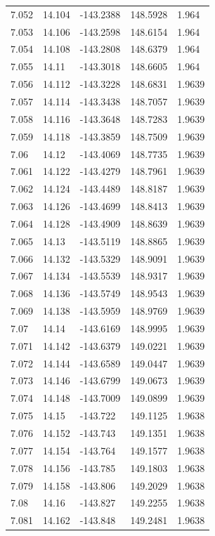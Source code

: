\begin{tabular}{lllll}
7.052 & 14.104 & -143.2388 & 148.5928 & 1.964 \\
7.053 & 14.106 & -143.2598 & 148.6154 & 1.964 \\
7.054 & 14.108 & -143.2808 & 148.6379 & 1.964 \\
7.055 & 14.11 & -143.3018 & 148.6605 & 1.964 \\
7.056 & 14.112 & -143.3228 & 148.6831 & 1.9639 \\
7.057 & 14.114 & -143.3438 & 148.7057 & 1.9639 \\
7.058 & 14.116 & -143.3648 & 148.7283 & 1.9639 \\
7.059 & 14.118 & -143.3859 & 148.7509 & 1.9639 \\
7.06 & 14.12 & -143.4069 & 148.7735 & 1.9639 \\
7.061 & 14.122 & -143.4279 & 148.7961 & 1.9639 \\
7.062 & 14.124 & -143.4489 & 148.8187 & 1.9639 \\
7.063 & 14.126 & -143.4699 & 148.8413 & 1.9639 \\
7.064 & 14.128 & -143.4909 & 148.8639 & 1.9639 \\
7.065 & 14.13 & -143.5119 & 148.8865 & 1.9639 \\
7.066 & 14.132 & -143.5329 & 148.9091 & 1.9639 \\
7.067 & 14.134 & -143.5539 & 148.9317 & 1.9639 \\
7.068 & 14.136 & -143.5749 & 148.9543 & 1.9639 \\
7.069 & 14.138 & -143.5959 & 148.9769 & 1.9639 \\
7.07 & 14.14 & -143.6169 & 148.9995 & 1.9639 \\
7.071 & 14.142 & -143.6379 & 149.0221 & 1.9639 \\
7.072 & 14.144 & -143.6589 & 149.0447 & 1.9639 \\
7.073 & 14.146 & -143.6799 & 149.0673 & 1.9639 \\
7.074 & 14.148 & -143.7009 & 149.0899 & 1.9639 \\
7.075 & 14.15 & -143.722 & 149.1125 & 1.9638 \\
7.076 & 14.152 & -143.743 & 149.1351 & 1.9638 \\
7.077 & 14.154 & -143.764 & 149.1577 & 1.9638 \\
7.078 & 14.156 & -143.785 & 149.1803 & 1.9638 \\
7.079 & 14.158 & -143.806 & 149.2029 & 1.9638 \\
7.08 & 14.16 & -143.827 & 149.2255 & 1.9638 \\
7.081 & 14.162 & -143.848 & 149.2481 & 1.9638 \\

\end{tabular}
